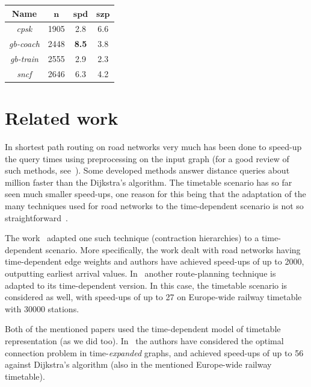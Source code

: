 \documentclass{svk_long_en}
\newcommand{\indt}{\hspace{6ex}}
\begin{document}
	\begin{table}[H]
		\centering
		\begin{tabular}{c|c|c|c}
            \rowcolor{tablehead}
            \textbf{Name} & $\bm{n}$ & $\bm{spd}$ & $\bm{szp}$ \\
			\hline
			\textit{cpsk} & 1905 & 2.8 & 6.6 \\
			\textit{gb-coach} & 2448 & \textbf{8.5} & 3.8 \\
			\textit{gb-train} & 2555 & 2.9 & 2.3 \\
			\textit{sncf} & 2646 & 6.3 & 4.2 \\
		\end{tabular}
		\label{tab:uspora-speedup}
	\end{table}	
	
\section{Related work}

	In shortest path routing on road networks very much has been done to speed-up the query times using preprocessing on the input graph (for a good review of such methods, see~\cite{engineeringroute09}). Some developed methods answer distance queries about million faster than the Dijkstra's algorithm. The timetable scenario has so far seen much smaller speed-ups, one reason for this being that the adaptation of the many techniques used for road networks to the time-dependent scenario is not so straightforward~\cite{engtimeexp09}.
	
	\indt The work~\cite{timedepch09} adapted one such technique (contraction hierarchies) to a time-dependent scenario. More specifically, the work dealt with road networks having time-dependent edge weights and authors have achieved speed-ups of up to 2000, outputting earliest arrival values. In~\cite{sharc08} another route-planning technique is adapted to its time-dependent version. In this case, the timetable scenario is considered as well, with speed-ups of up to 27 on Europe-wide railway timetable with 30000 stations.
			
	\indt Both of the mentioned papers used the time-dependent model of timetable representation (as we did too). In~\cite{engtimeexp09} the authors have considered the optimal connection problem in time-\textit{expanded} graphs, and achieved speed-ups of up to 56 against Dijkstra's algorithm (also in the mentioned Europe-wide railway timetable).
	
\end{document}
